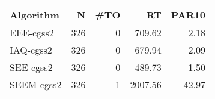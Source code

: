\begin{tabular}{lrrrr}
\toprule
 Algorithm &   N &  \#TO &      RT &  PAR10 \\
\midrule
 EEE-cgss2 & 326 &    0 &  709.62 &   2.18 \\
 IAQ-cgss2 & 326 &    0 &  679.94 &   2.09 \\
 SEE-cgss2 & 326 &    0 &  489.73 &   1.50 \\
SEEM-cgss2 & 326 &    1 & 2007.56 &  42.97 \\
\bottomrule
\end{tabular}
